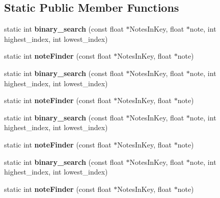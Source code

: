 \subsection*{Static Public Member Functions}
\begin{DoxyCompactItemize}
\item 
\hypertarget{classvocoder_a54dbb5d460704f880382d2ae7e64e14a}{static int {\bfseries binary\-\_\-search} (const float $\ast$Notes\-In\-Key, float $\ast$note, int highest\-\_\-index, int lowest\-\_\-index)}\label{classvocoder_a54dbb5d460704f880382d2ae7e64e14a}

\item 
\hypertarget{classvocoder_a450b5c7824587e81db5aa4c056ba6934}{static int {\bfseries note\-Finder} (const float $\ast$Notes\-In\-Key, float $\ast$note)}\label{classvocoder_a450b5c7824587e81db5aa4c056ba6934}

\item 
\hypertarget{classvocoder_a54dbb5d460704f880382d2ae7e64e14a}{static int {\bfseries binary\-\_\-search} (const float $\ast$Notes\-In\-Key, float $\ast$note, int highest\-\_\-index, int lowest\-\_\-index)}\label{classvocoder_a54dbb5d460704f880382d2ae7e64e14a}

\item 
\hypertarget{classvocoder_a450b5c7824587e81db5aa4c056ba6934}{static int {\bfseries note\-Finder} (const float $\ast$Notes\-In\-Key, float $\ast$note)}\label{classvocoder_a450b5c7824587e81db5aa4c056ba6934}

\item 
\hypertarget{classvocoder_a54dbb5d460704f880382d2ae7e64e14a}{static int {\bfseries binary\-\_\-search} (const float $\ast$Notes\-In\-Key, float $\ast$note, int highest\-\_\-index, int lowest\-\_\-index)}\label{classvocoder_a54dbb5d460704f880382d2ae7e64e14a}

\item 
\hypertarget{classvocoder_a450b5c7824587e81db5aa4c056ba6934}{static int {\bfseries note\-Finder} (const float $\ast$Notes\-In\-Key, float $\ast$note)}\label{classvocoder_a450b5c7824587e81db5aa4c056ba6934}

\item 
\hypertarget{classvocoder_a54dbb5d460704f880382d2ae7e64e14a}{static int {\bfseries binary\-\_\-search} (const float $\ast$Notes\-In\-Key, float $\ast$note, int highest\-\_\-index, int lowest\-\_\-index)}\label{classvocoder_a54dbb5d460704f880382d2ae7e64e14a}

\item 
\hypertarget{classvocoder_a450b5c7824587e81db5aa4c056ba6934}{static int {\bfseries note\-Finder} (const float $\ast$Notes\-In\-Key, float $\ast$note)}\label{classvocoder_a450b5c7824587e81db5aa4c056ba6934}

\end{DoxyCompactItemize}
